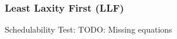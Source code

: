 \documentclass[xcolor=table]{beamer}
\begin{document}
\begin{frame}
\frametitle{Least Laxity First (\textbf{LLF})}

\begin{block}{Schedulability Test:}
TODO: Missing equations
\end{block}

\end{frame}
\end{document}
